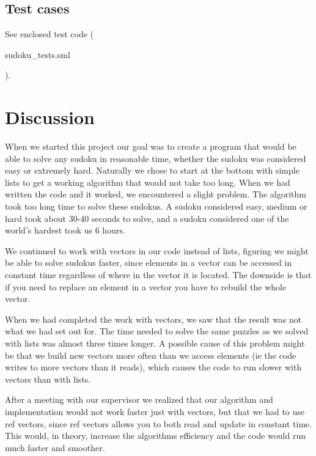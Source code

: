 \documentclass[12pt, a4paper]{article}
\begin{document}
\begin{adjustwidth}{2em}{0pt}
		\subsection{Test cases}
			\begin{adjustwidth}{3em}{0pt}
				See enclosed test code (\begin{ttfamily}sudoku\_tests.sml\end{ttfamily}).
			\end{adjustwidth}
	\end{adjustwidth}

	\section{Discussion}
		\begin{adjustwidth}{3em}{0pt}
			When we started this project our goal was to create a program that would be able to solve any sudoku in reasonable time, whether the sudoku was considered easy or extremely hard. Naturally we chose to start at the bottom with simple lists to get a working algorithm that would not take too long. When we had written the code and it worked, we encountered a slight problem. The algorithm took too long time to solve these sudokus. A sudoku considered easy, medium or hard took about 30-40 seconds to solve, and a sudoku considered one of the world’s hardest took us 6 hours.

			We continued to work with vectors in our code instead of lists, figuring we might be able to  solve sudokus faster, since elements in a vector can be accessed in constant time regardless of where in the vector it is located. The downside is that if you need to replace an element in a vector you have to rebuild the whole vector.

			When we had completed the work with vectors, we saw that the result was not what we had set out for. The time needed to solve the same puzzles as we solved with lists was almost three times longer. A possible cause of this problem might be that we build new vectors more often than we access elements (ie the code writes to more vectors than it reads), which causes the code to run slower with vectors than with lists.

			After a meeting with our supervisor we realized that our algorithm and implementation would not work faster just with vectors, but that we had to use ref vectors, since ref vectors allows you to both read and update in constant time. This would, in theory, increase the algorithms efficiency and the code would run much faster and smoother.


\end{adjustwidth}
\end{document}
